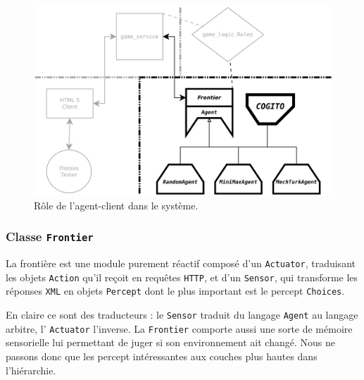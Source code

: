 \begin{figure}[H] 
\centering
\includegraphics[width=\textwidth]{files/william/archi_client_machine} 
\caption{Rôle de l'agent-client dans le système.} 
\end{figure}

\subsubsection{Classe \texttt{Frontier}}
La frontière est une module purement réactif composé d'un \texttt{Actuator}, traduisant les objets \texttt{Action} qu'il reçoit en requêtes \texttt{HTTP}, et d'un \texttt{Sensor}, qui transforme les réponses \texttt{XML} en objets \texttt{Percept} dont le plus important est le percept \texttt{Choices}.

En claire ce sont des traducteurs : le \texttt{Sensor} traduit du langage \texttt{Agent} au langage arbitre, l' \texttt{Actuator} l'inverse. La \texttt{Frontier} comporte aussi une sorte de mémoire sensorielle lui permettant de juger si son environnement ait changé. Nous ne passons donc que les percept intéressantes aux couches plus hautes dans l'hiérarchie.  

